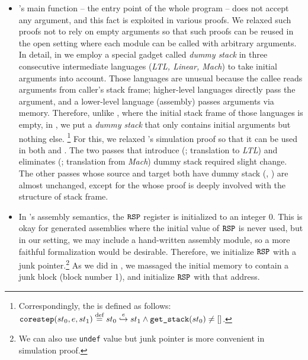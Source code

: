 \begin{itemize}
\item
  \cc{}'s main function -- the entry point of the whole program -- does not accept any argument, and this fact is exploited in various proofs.
  We relaxed such proofs not to rely on empty arguments so that such proofs can be reused in the open setting where each module can be called with arbitrary arguments. 
  \\
  In detail, in \ccm{} we employ a special gadget called \emph{dummy stack} in three consecutive intermediate languages (\emph{LTL, Linear, Mach}) to take initial arguments into account.
  Those languages are unusual because the callee reads arguments from caller's stack frame; higher-level languages directly pass the argument, and a lower-level language (assembly) passes arguments via memory.
  Therefore, unlike \cc{}, where the initial stack frame of those languages is empty, in \ccm{}, we put a \emph{dummy stack} that only contains initial arguments but nothing else.
  \footnote{Correspondingly, the  is defined as follows: $\texttt{corestep}(st_0, e, st_1) \stackrel{\text{def}}{=} st_0 \stackrel{e}{\hookrightarrow} st_1 \land \texttt{get\_stack}(st_0) \neq []$.}
  For this, we relaxed \cc{}'s simulation proof so that it can be used in both \cc{} and \ccm{}.
  The two passes that introduce (; translation to \emph{LTL}) and eliminates (; translation from \emph{Mach}) dummy stack required slight change.
  The other passes whose source and target both have dummy stack (\eg {}, ) are almost unchanged,
  except for the  whose proof is deeply involved with the structure of stack frame.

\item
  In \cc{}'s assembly semantics, the $\texttt{RSP}$ register is initialized to an integer 0.
  This is okay for \cc{} generated assemblies where the initial value of $\texttt{RSP}$ is never used, but in our setting, we may include a hand-written assembly module, so a more faithful formalization would be desirable.
  Therefore, we initialize $\texttt{RSP}$ with a junk pointer.\footnote{We can also use \texttt{undef} value but junk pointer is more convenient in simulation proof.}
  As we did in , we massaged the initial memory to contain a junk block (block number 1), and initialize $\texttt{RSP}$ with that address.

\end{itemize}
